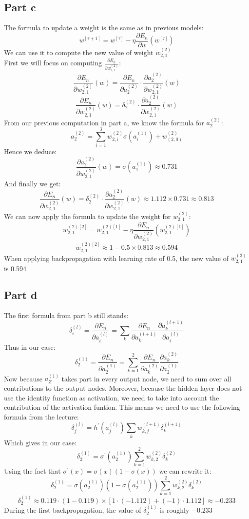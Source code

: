 \documentclass[a4paper, 10pt]{article}
\begin{document}
\subsection{Part c}
The formula to update a weight is the same as in previous models:
$$
w^{[\tau +1]} = w^{[\tau]} - \eta \frac{\partial E_n}{\partial w}(w^{[\tau]})
$$
We can use it to compute the new value of weight $w_{2,1}^{(2)}$ 
\\
First we will focus on computing $\frac{\partial E_n}{\partial w_{2,1}^{(2)}}$:
$$
\frac{\partial E_n}{\partial w_{2,1}^{(2)}}(w) = \frac{\partial E_n}{\partial a_2^{(2)}} \cdot \frac{\partial a_2^{(2)}}{\partial w_{2,1}^{(2)}}(w)
$$
$$
\frac{\partial E_n}{\partial w_{2,1}^{(2)}}(w) = \delta_2^{(2)} \cdot \frac{\partial a_2^{(2)}}{\partial w_{2,1}^{(2)}}(w) 
$$
From our previous computation in part a, we know the formula for $a_2^{(2)}$:
$$
a_2^{(2)} = \sum_{i=1}^3 w_{2,i}^{(2)}\sigma(a_i^{(1)}) + w_{(2,0)}^{(2)}
$$
Hence we deduce:
$$
\frac{\partial a_2^{(2)}}{\partial w_{2,1}^{(2)}}(w) = \sigma(a_1^{(1)}) \approx 0.731
$$
And finally we get:
$$
\frac{\partial E_n}{\partial w_{2,1}^{(2)}}(w) = \delta_2^{(2)} \cdot \frac{\partial a_2^{(2)}}{\partial w_{2,1}^{(2)}}(w) \approx 1.112 \times 0.731 \approx 0.813 
$$
We can now apply the formula to update the weight for $w_{2,1}^{(2)}$:
$$
w_{2,1}^{(2)[2]} = w_{2,1}^{(2)[1]} - \eta \frac{\partial E_n}{\partial w_{2,1}^{(2)}}(w_{2,1}^{(2)[1]}) 
$$
$$
w_{2,1}^{(2)[2]} \approx 1 - 0.5 \times 0.813 \approx 0.594
$$
When applying backpropagation with learning rate of 0.5, the new value of $w_{2,1}^{(2)}$ is 0.594
\subsection{Part d}
The first formula from part b still stands:
$$
\delta_i^{(l)} = \frac{\partial E_n}{\partial a_i^{(l)}} = \sum_k \frac{\partial E_n}{\partial a_k^{(l+1)}}\frac{\partial a_k^{(l+1)}}{\partial a_i^{(l)}}
$$
Thus in our case:
$$
\delta_2^{(1)} = \frac{\partial E_n}{\partial a_2^{(1)}} = \sum_{k=1}^2 \frac{\partial E_n}{\partial a_k^{(2)}}\frac{\partial a_k^{(2)}}{\partial a_2^{(1)}}
$$
Now because $a_Z^{(1)}$ takes part in every output node, we need to sum over all contributions to the output nodes.
Moreover, because the hidden layer does not use the identity function as activation, we need to take into account the contribution
of the activation funtion. This means we need to use the following formula from the lecture:
$$
\delta_j^{(l)} = h^\prime(a_j^{(l)})\sum_k w_{k,j}^{(l+1)}\delta_k^{(l+1)} 
$$
Which gives in our case:
$$
\delta_2^{(1)} = \sigma^\prime(a_2^{(1)})\sum_{k=1}^2 w_{k,2}^{(2)}\delta_k^{(2)} 
$$
Using the fact that $\sigma^\prime(x) = \sigma(x)(1-\sigma(x))$ we can rewrite it:
$$
\delta_2^{(1)} = \sigma(a_2^{(1)})(1-\sigma(a_2^{(1)}))\sum_{k=1}^2 w_{k,2}^{(2)}\delta_k^{(2)} 
$$
$$
\delta_2^{(1)} \approx 0.119\cdot(1-0.119)\times [1\cdot(-1.112)+(-1)\cdot1.112] \approx -0.233
$$
During the first backpropagation, the value of $\delta_2^{(1)}$ is roughly $-0.233$
\end{document}

